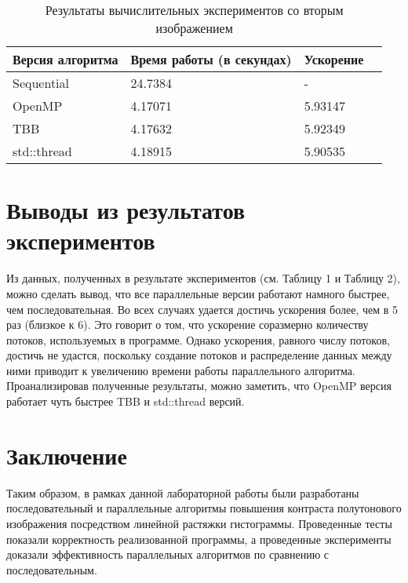 \documentclass{report}
\begin{document}
\begin{table}[!h]
\caption{Результаты вычислительных экспериментов со вторым изображением}
\centering
\begin{tabular}{| p{2cm} | p{3cm} | p{4cm} | p{2cm} |}
\hline
Версия алгоритма & Время работы (в секундах) & Ускорение  \\[5pt]
\hline
Sequential      & 24.7384       & -         \\
OpenMP        & 4.17071        & 5.93147          \\
TBB       & 4.17632       & 5.92349         \\
std::thread        & 4.18915        & 5.90535          \\

\hline
\end{tabular}
\end{table}

\newpage

\section*{Выводы из результатов экспериментов}
Из данных, полученных в результате экспериментов (см. Таблицу 1 и Таблицу 2), можно сделать вывод, что все параллельные версии работают намного быстрее, чем последовательная. Во всех случаях удается достичь ускорения более, чем в 5 раз (близкое к 6). Это говорит о том, что ускорение соразмерно количеству потоков, используемых в программе. Однако ускорения, равного числу потоков, достичь не удастся, поскольку создание потоков и распределение данных между ними приводит к увеличению времени работы параллельного алгоритма. Проанализировав полученные результаты, можно заметить, что OpenMP версия работает чуть быстрее TBB и std::thread версий.
\newpage

\section*{Заключение}
Таким образом, в рамках данной лабораторной работы были разработаны последовательный и параллельные алгоритмы повышения контраста полутонового изображения посредством линейной растяжки гистограммы. Проведенные тесты показали корректность реализованной программы, а проведенные эксперименты доказали эффективность параллельных алгоритмов по сравнению с последовательным.
\newpage
\end{document}
